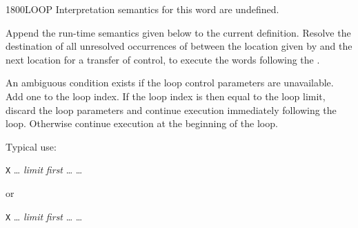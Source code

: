 \begin{worddef}{1800}{LOOP}
\interpret
	Interpretation semantics for this word are undefined.

\compile

	Append the run-time semantics given below to the current
	definition. Resolve the destination of all unresolved
	occurrences of  between the location given by
	 and the next location for a transfer of
	control, to execute the words following the .

\runtime
	\stack{}{}

	An ambiguous condition exists if the loop control parameters are
	unavailable. Add one to the loop index. If the loop index is then
	equal to the loop limit, discard the loop parameters and continue
	execution immediately following the loop. Otherwise continue
	execution at the beginning of the loop.


	\begin{rationale} %
		\enlargethispage{2ex}
		Typical use:

		\tab \word{:} \texttt{X} {\ldots}
			\emph{limit} \emph{first} 
				{\ldots}
		{\ldots} \word{;}

		or

		\tab \word{:} \texttt{X} {\ldots}
			\emph{limit} \emph{first} 
				{\ldots}
		{\ldots} \word{;}
	\end{rationale}

	\begin{testing} %
		 \\
		 \\
		 \\
	\end{testing}
\end{worddef}


